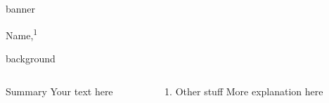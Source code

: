 \documentclass{beamer}
\begin{document}
\begin{frame}[t]{}
\begin{beamercolorbox}[wd=\textwidth,sep=1em]{banner}
\begin{center}


            \vspace{1em}
            \large
            Name,\textsuperscript{1}
            \vspace{1em}
        \end{center}
    \end{beamercolorbox}

    \vspace{-0.001\paperheight}
    \begin{beamercolorbox}[ht=0.675\paperheight,wd=\textwidth]{background}

        \begin{columns}[t]
            \begin{column}{0.37\linewidth}
                \begin{block}{Summary}
                    Your text here
                \end{block}

            \end{column}

            \begin{column}{0.57\linewidth}

                \begin{block}{1. Other stuff}
                    More explanation here
                \end{block}


\end{column}
\end{columns}
\end{beamercolorbox}
\end{frame}
\end{document}
